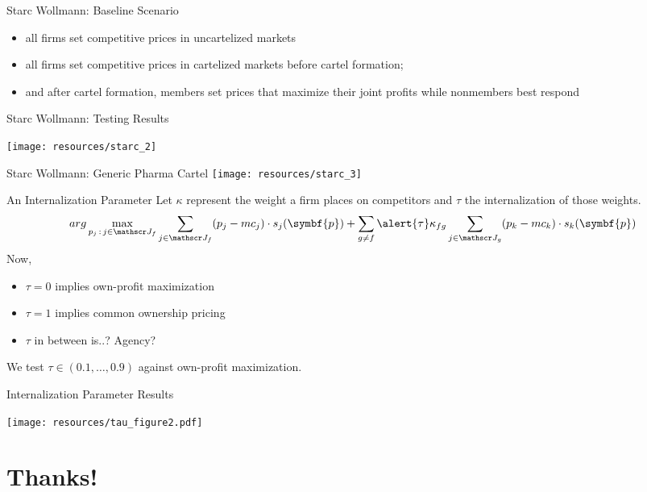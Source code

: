 \documentclass[aspectratio=169,10pt]{beamer}
\begin{document}
\begin{frame}{Starc Wollmann: Baseline Scenario }
\begin{itemize}
\item all firms set competitive prices in uncartelized markets
\item all firms set competitive prices in cartelized markets before cartel formation;
\item  and after cartel formation, members set prices that maximize their joint profits while nonmembers best respond
\end{itemize}
\end{frame}

\begin{frame}{Starc Wollmann: Testing Results }
\begin{center}
\texttt{[image: resources/starc\_2]}
\end{center}
\end{frame}

\begin{frame}{Starc Wollmann: Generic Pharma Cartel }
\texttt{[image: resources/starc\_3]}
\end{frame}


\begin{frame}[plain]{An Internalization Parameter}
Let $\kappa$ represent the weight a firm places on competitors and $\tau$ the internalization of those weights.
 \begin{equation*}
 arg\max_{p_j \,:\, j \in \calJ_f} \sum_{j \in \calJ_f} (p_j - mc_j) \cdot s_j(\symbf{p})+
 \sum_{g\neq f} \alert{\tau} \kappa_{fg} \sum_{j \in \calJ_g} (p_k - mc_k) \cdot s_k(\symbf{p})
 \end{equation*}
Now, 
\begin{itemize}
\item $\tau = 0$ implies own-profit maximization
\item $\tau = 1$ implies common ownership pricing
\item $\tau$ in between is..? Agency?
\end{itemize}
We test $\tau \in (0.1, \ldots, 0.9)$ against own-profit maximization.
\end{frame}

\begin{frame}[plain]{Internalization Parameter Results}
\begin{center}
\texttt{[image: resources/tau\_figure2.pdf]}
\end{center}
\end{frame}


\section{Thanks!}
\end{document}
